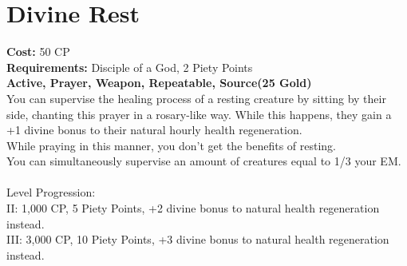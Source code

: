 \section{Divine Rest}\label{prayer:divineRest}
\textbf{Cost:} 50 CP\\
\textbf{Requirements:} Disciple of a God, 2 Piety Points \\
\textbf{Active, Prayer, Weapon, Repeatable, Source(25 Gold)}\\
You can supervise the healing process of a resting creature by sitting by their side, chanting this prayer in a rosary-like way.
While this happens, they gain a +1 divine bonus to their natural hourly health regeneration.\\
While praying in this manner, you don't get the benefits of resting.\\
You can simultaneously supervise an amount of creatures equal to 1/3 your EM.\\
\\
Level Progression:\\
II: 1,000 CP, 5 Piety Points, +2 divine bonus to natural health regeneration instead.\\
III: 3,000 CP, 10 Piety Points, +3 divine bonus to natural health regeneration instead.\\